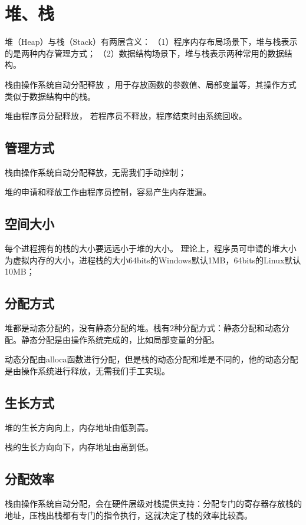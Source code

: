 \documentclass[letterpaper,10pt,english]{sphinxmanual}
\begin{document}
\section{堆、栈}
\label{\detokenize{cpp/11_heapStack::doc}}\label{\detokenize{cpp/11_heapStack:id1}}
堆（Heap）与栈（Stack）有两层含义：
（1）程序内存布局场景下，堆与栈表示的是两种内存管理方式；
（2）数据结构场景下，堆与栈表示两种常用的数据结构。

栈由操作系统自动分配释放 ，用于存放函数的参数值、局部变量等，其操作方式类似于数据结构中的栈。

堆由程序员分配释放， 若程序员不释放，程序结束时由系统回收。


\subsection{管理方式}
\label{\detokenize{cpp/11_heapStack:id2}}
栈由操作系统自动分配释放，无需我们手动控制；

堆的申请和释放工作由程序员控制，容易产生内存泄漏。


\subsection{空间大小}
\label{\detokenize{cpp/11_heapStack:id3}}
每个进程拥有的栈的大小要远远小于堆的大小。
理论上，程序员可申请的堆大小为虚拟内存的大小，进程栈的大小64bits的Windows默认1MB，64bits的Linux默认10MB；


\subsection{分配方式}
\label{\detokenize{cpp/11_heapStack:id4}}
堆都是动态分配的，没有静态分配的堆。栈有2种分配方式：静态分配和动态分配。静态分配是由操作系统完成的，比如局部变量的分配。

动态分配由alloca函数进行分配，但是栈的动态分配和堆是不同的，他的动态分配是由操作系统进行释放，无需我们手工实现。


\subsection{生长方式}
\label{\detokenize{cpp/11_heapStack:id5}}
堆的生长方向向上，内存地址由低到高。

栈的生长方向向下，内存地址由高到低。


\subsection{分配效率}
\label{\detokenize{cpp/11_heapStack:id6}}
栈由操作系统自动分配，会在硬件层级对栈提供支持：分配专门的寄存器存放栈的地址，压栈出栈都有专门的指令执行，这就决定了栈的效率比较高。
\end{document}
